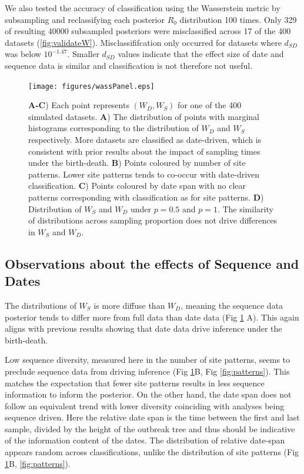 \documentclass{article}
\begin{document}
We also tested the accuracy of classification using the Wasserstein metric by subsampling and reclassifying each posterior $R_0$ distribution 100 times. Only 329 of resulting 40000 subsampled posteriors were misclassified  across 17 of the 400 datasets (\ref{fig:validateW}). Misclassififcation only occurred for datasets where $d_{SD}$ was below $10^{-1.47}$. Smaller $d_{SD}$ values indicate that the effect size of date and sequence data is similar and classification is not therefore not useful.

\begin{figure}[H]
\centering
\texttt{[image: figures/wassPanel.eps]}
\caption{\textbf{A-C}) Each point represents $(W_D, W_S)$ for one of the 400 simulated datasets. \textbf{A}) The distribution of points with marginal histograms corresponding to the distribution of $W_D$ and $W_S$ respectively. More datasets are classified as date-driven, which is consistent with prior results about the impact of sampling times under the birth-death. \textbf{B}) Points coloured by number of site patterns. Lower site patterns tends to co-occur with date-driven classification. \textbf{C}) Points coloured by date span with no clear patterns corresponding with classification as for site patterns. \textbf{D}) Distribution of $W_S$ and $W_D$ under $p=0.5$ and $p=1$. The similarity of distributions across sampling proportion does not drive differences in $W_S$ and $W_D$.}
\label{fig:wData}
\end{figure}

\subsection*{Observations about the effects of Sequence and Dates}
The distributions of $W_S$ is more diffuse than $W_D$, meaning the sequence data posterior tends to differ more from full data than date data (Fig \ref{fig:wData} A). This again aligns with previous results showing that date data drive inference under the birth-death.

Low sequence diversity, measured here in the number of site patterns, seems to preclude sequence data from driving inference (Fig \ref{fig:wData}B, Fig \ref{fig:patterns}). This matches the expectation that fewer site patterns results in less sequence information to inform the posterior. On the other hand, the date span  does not follow an equivalent trend with lower diversity coinciding with analyses being sequence driven. Here the relative date span is the time between the first and last sample, divided by the height of the outbreak tree and thus should be indicative of the information content of the dates. The distribution of relative date-span appears random across classifications, unlike the distribution of site patterns (Fig \ref{fig:wData}B, \ref{fig:patterns}).
\end{document}
